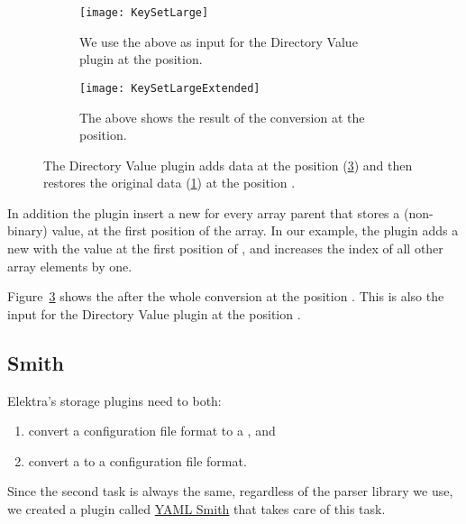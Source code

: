 \begin{figure}[H]
  \centering
  \begin{subfigure}[t]{.4\textwidth}
    \texttt{[image: KeySetLarge]}
    \caption{We use the  above as input for the Directory Value plugin at the  position.}
    \label{fig:keyset_large}
  \end{subfigure}
  \qquad
  \begin{subfigure}[t]{.48\textwidth}
    \texttt{[image: KeySetLargeExtended]}
    \caption{The  above shows the result of the conversion at the  position.}
    \label{fig:keyset_large_extended}
  \end{subfigure}
  \caption{The Directory Value plugin adds data at the position  (\ref{fig:keyset_large_extended}) and then restores the original data (\ref{fig:keyset_large}) at the position .}
\end{figure}

In addition the plugin insert a new  for every array parent that stores a (non-binary) value, at the first position of the array. In our example, the plugin adds a new  with the value  at the first position of , and increases the index of all other array elements by one.

Figure~\ref{fig:keyset_large_extended} shows the  after the whole conversion at the position . This  is also the input for the Directory Value plugin at the position .

\subsection{ Smith}

Elektra’s storage plugins need to both:

\begin{enumerate}
  \item convert a configuration file format to a , and
  \item convert a  to a configuration file format.
\end{enumerate}

Since the second task is always the same, regardless of the parser library we use, we created a plugin called \href{http://libelektra.org/plugins/yamlsmith}{YAML Smith} that takes care of this task.

